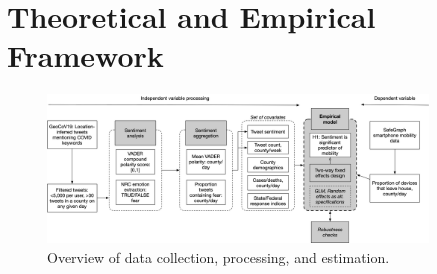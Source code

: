 \documentclass{article}
\begin{document}
\section{Theoretical and Empirical Framework}\label{methods}
\begin{figure}[!htb]
  \centering
  \caption{Overview of data collection, processing, and estimation.}\label{process}
  \includegraphics[width=0.9\textwidth]{figs/processing.png}
\end{figure}
\end{document}
